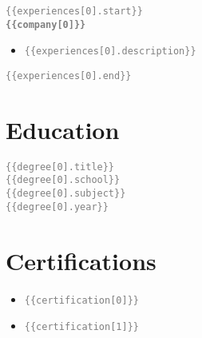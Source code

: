 \documentclass[10pt,letterpaper]{article}
\newcommand{\tpl}[1]{\textcolor{Gray}{\texttt{\{\{#1\}\}}}}
\begin{document}
\begin{paracol}{2}
\begin{rightcolumn}
\begin{tcolorbox}
  \begin{minipage}[t]{0.48\linewidth}
    \tpl{experiences[0].start}\\
    \textbf{\tpl{company[0]}}\\
    \begin{itemize}
      \item \tpl{experiences[0].description}
    \end{itemize}
  \end{minipage}\hfill
  \begin{minipage}[t]{0.48\linewidth}\raggedleft
    \tpl{experiences[0].end}
  \end{minipage}
\end{tcolorbox}

\vspace{0.9in}
\section*{Education}
\begin{tcolorbox}[colback=white,boxrule=1pt,colframe=primary]
  \tpl{degree[0].title}\\
  \tpl{degree[0].school}\\
  \tpl{degree[0].subject}\\
  \tpl{degree[0].year}
\end{tcolorbox}

\section*{Certifications}
\begin{itemize}
  \item \tpl{certification[0]}
  \item \tpl{certification[1]}
\end{itemize}

\end{rightcolumn}
\end{paracol}
\end{document}
